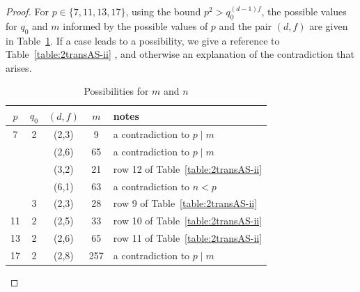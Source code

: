 \documentclass[12pt]{amsart}
\theoremstyle{remark}
\theoremstyle{definition}
\newcommand{\PSL}{\mathrm{PSL}}
\begin{document}
\begin{proof}
For $p\in \{7, 11, 13, 17\}$, using the bound $p^2 > q_0^{(d-1)f}$,  the possible values for $q_0$ and $m$ informed  by the possible values of $p$ and the pair $(d,f)$ are given in Table~\ref{tab: p q}. If a case leads to a possibility, we give a  reference to Table~\ref{table:2transAS-ii} , and otherwise an explanation of the contradiction that arises.
\begin{table}[h]
\begin{tabular}{c | c | c  | c | l  }
$p$  & $q_0$  & $(d,f)$ & $m$ & notes \\
\hline
7 & 2 &  (2,3)  & 9  &  a contradiction to $p \mid m$ \\
  &    &   (2,6)  &   65 &  a contradiction to $p \mid m$ \\
  &   & (3,2)  &  21 & row 12 of Table~\ref{table:2transAS-ii} \\
  &    &   (6,1)  & 63 & a contradiction to $n  < p$ \\
  & 3   & (2,3) & 28 &  row 9 of Table~\ref{table:2transAS-ii} \\
11& $ 2$  & (2,5) & 33 & row 10 of Table~\ref{table:2transAS-ii} \\
13 & 2 & (2,6) & 65 & row 11 of Table~\ref{table:2transAS-ii}  \\
17 & 2 & (2,8)  & 257  & a contradiction to $p \mid m$
\end{tabular}\caption{Possibilities for $m$ and $n$} \label{tab: p q}
\end{table}


%
%
%
%
%
%
%





\end{proof}
\end{document}

